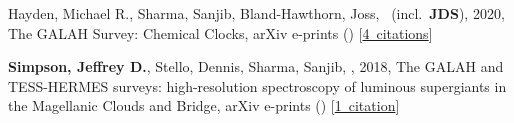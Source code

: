 \item[{\color{numcolor}\scriptsize2}] Hayden, Michael R., Sharma, Sanjib, Bland-Hawthorn, Joss, \etal\ (incl.\ \textbf{JDS}), 2020, The GALAH Survey: Chemical Clocks, arXiv e-prints () [\href{https://ui.adsabs.harvard.edu/#abs/2020arXiv201113745H}{4~citations}]

\item[{\color{numcolor}\scriptsize1}] \textbf{Simpson, Jeffrey D.}, Stello, Dennis, Sharma, Sanjib, \etal, 2018, The GALAH and TESS-HERMES surveys: high-resolution spectroscopy of luminous supergiants in the Magellanic Clouds and Bridge, arXiv e-prints () [\href{https://ui.adsabs.harvard.edu/#abs/2018arXiv180405900S}{1~citation}]